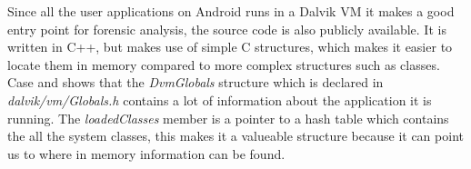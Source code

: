 Since all the user applications on Android runs in a Dalvik VM it makes a good entry
point for forensic analysis, the source code is also publicly available. It is
written in C++, but makes use of simple C structures, which makes it easier to
locate them in memory compared to more complex structures such as classes. Case
and \cite{holger} shows that the \textit{DvmGlobals} structure which is
declared in \textit{dalvik/vm/Globals.h} contains a lot of information about
the application it is running. The \textit{loadedClasses} member is a pointer
to a hash table which contains the all the system classes, this makes it a
valueable structure because it can point us to where in memory information can
be found. 


